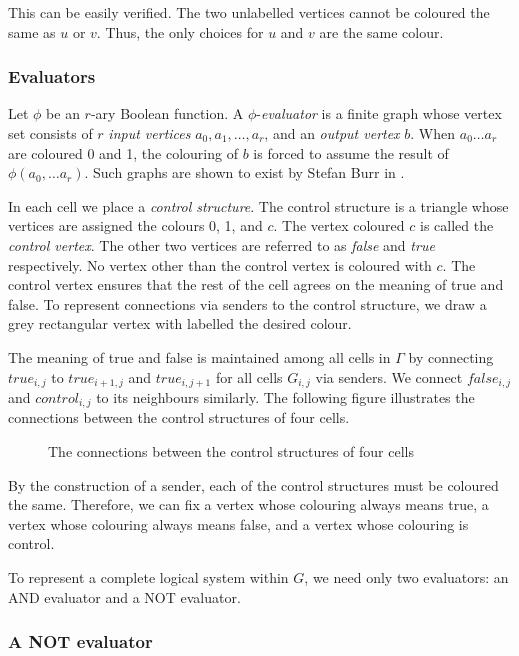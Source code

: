 \documentclass[letterpaper]{article}
\begin{document}
This can be easily verified.
The two unlabelled vertices cannot be coloured the same as $u$ or $v$.
Thus, the only choices for $u$ and $v$ are the same colour.

\subsubsection{Evaluators}
Let $\phi$ be an $r$-ary Boolean function.
A $\phi$-\emph{evaluator} is a finite graph whose vertex set consists of $r$ \emph{input vertices} $a_0, a_1, \ldots, a_r$, and an \emph{output vertex} $b$.
When $a_0 \ldots a_r$ are coloured 0 and 1, the colouring of $b$ is forced to assume the result of $\phi(a_0, \ldots a_r)$. Such graphs are shown to exist by Stefan Burr in \cite{burr90}.

In each cell we place a \emph{control structure}.
The control structure is a triangle whose vertices are assigned the colours 0, 1, and $c$.
The vertex coloured $c$ is called the \emph{control vertex}.
The other two vertices are referred to as \emph{false} and \emph{true} respectively.
No vertex other than the control vertex is coloured with $c$.
The control vertex ensures that the rest of the cell agrees on the meaning of true and false.
To represent connections via senders to the control structure, we draw a grey rectangular vertex with labelled the desired colour.

The meaning of true and false is maintained among all cells in $\Gamma$ by connecting $true_{i,j}$ to $true_{i+1,j}$ and $true_{i,j+1}$ for all cells $G_{i,j}$ via senders.
We connect $false_{i,j}$ and $control_{i,j}$ to its neighbours similarly.
The following figure illustrates the connections between the control structures of four cells.

\begin{figure}[H]
\centering
\caption{The connections between the control structures of four cells}
%
\end{figure}

By the construction of a sender, each of the control structures must be coloured the same.
Therefore, we can fix a vertex whose colouring always means true, a vertex whose colouring always means false, and a vertex whose colouring is control.

To represent a complete logical system within $G$, we need only two evaluators: an AND evaluator and a NOT evaluator.

\subsubsection{A NOT evaluator}
\end{document}
